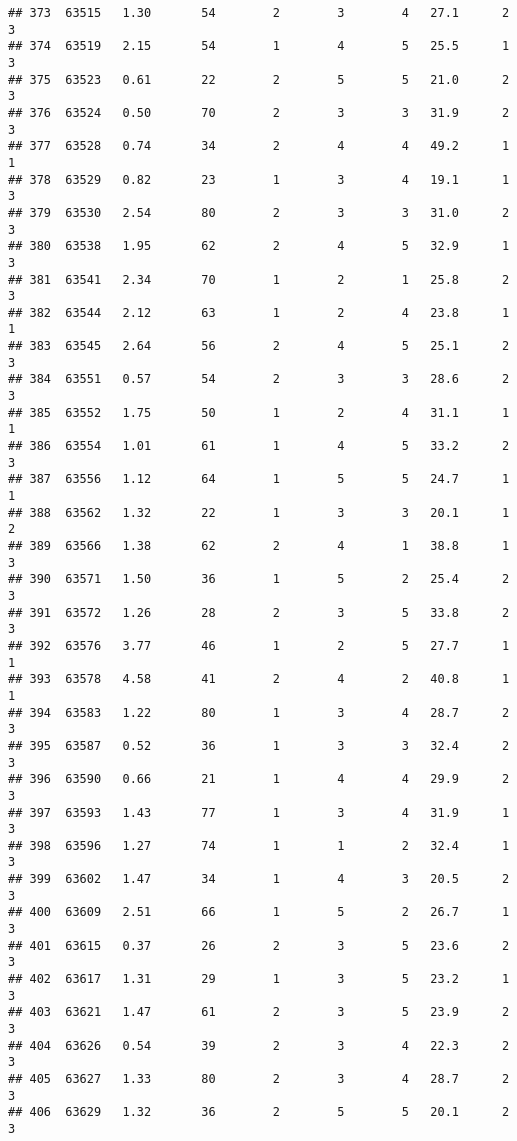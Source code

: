 \documentclass[
]{article}
\begin{document}
\begin{verbatim}
## 373  63515   1.30       54        2        3        4   27.1      2      3
## 374  63519   2.15       54        1        4        5   25.5      1      3
## 375  63523   0.61       22        2        5        5   21.0      2      3
## 376  63524   0.50       70        2        3        3   31.9      2      3
## 377  63528   0.74       34        2        4        4   49.2      1      1
## 378  63529   0.82       23        1        3        4   19.1      1      3
## 379  63530   2.54       80        2        3        3   31.0      2      3
## 380  63538   1.95       62        2        4        5   32.9      1      3
## 381  63541   2.34       70        1        2        1   25.8      2      3
## 382  63544   2.12       63        1        2        4   23.8      1      1
## 383  63545   2.64       56        2        4        5   25.1      2      3
## 384  63551   0.57       54        2        3        3   28.6      2      3
## 385  63552   1.75       50        1        2        4   31.1      1      1
## 386  63554   1.01       61        1        4        5   33.2      2      3
## 387  63556   1.12       64        1        5        5   24.7      1      1
## 388  63562   1.32       22        1        3        3   20.1      1      2
## 389  63566   1.38       62        2        4        1   38.8      1      3
## 390  63571   1.50       36        1        5        2   25.4      2      3
## 391  63572   1.26       28        2        3        5   33.8      2      3
## 392  63576   3.77       46        1        2        5   27.7      1      1
## 393  63578   4.58       41        2        4        2   40.8      1      1
## 394  63583   1.22       80        1        3        4   28.7      2      3
## 395  63587   0.52       36        1        3        3   32.4      2      3
## 396  63590   0.66       21        1        4        4   29.9      2      3
## 397  63593   1.43       77        1        3        4   31.9      1      3
## 398  63596   1.27       74        1        1        2   32.4      1      3
## 399  63602   1.47       34        1        4        3   20.5      2      3
## 400  63609   2.51       66        1        5        2   26.7      1      3
## 401  63615   0.37       26        2        3        5   23.6      2      3
## 402  63617   1.31       29        1        3        5   23.2      1      3
## 403  63621   1.47       61        2        3        5   23.9      2      3
## 404  63626   0.54       39        2        3        4   22.3      2      3
## 405  63627   1.33       80        2        3        4   28.7      2      3
## 406  63629   1.32       36        2        5        5   20.1      2      3

\end{verbatim}
\end{document}
